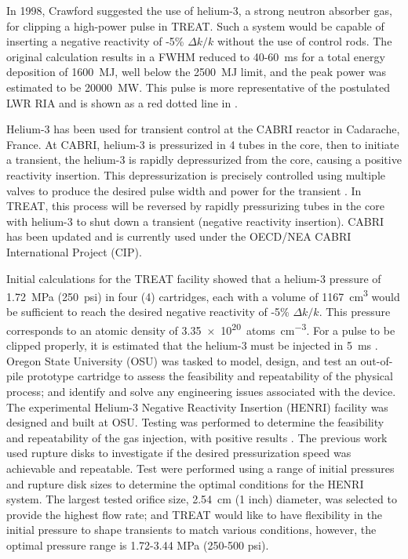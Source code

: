 In 1998, Crawford \cite{Crawford1998} suggested the use of helium-3, a strong neutron absorber gas, for clipping a high-power pulse in TREAT. Such a system would be capable of inserting a negative reactivity of -5\% $\Delta k/k$ without the use of control rods. The original calculation results in a FWHM reduced to 40-\SI{60}{\milli\second} for a total energy deposition of \SI{1600}{\mega\joule}, well below the \SI{2500}{\mega\joule} limit, and the peak power was estimated to be \SI{20000}{\mega\watt}. This pulse is more representative of the postulated LWR RIA and is shown as a red dotted line in .

Helium-3 has been used for transient control at the CABRI reactor in Cadarache, France. At CABRI, helium-3 is pressurized in 4 tubes in the core, then to initiate a transient, the helium-3 is rapidly depressurized from the core, causing a positive reactivity insertion. This depressurization is precisely controlled using multiple valves to produce the desired pulse width and power for the transient \cite{Clamens2016,Clamens2018,Clamens2018b}. In TREAT, this process will be reversed by rapidly pressurizing tubes in the core with helium-3 to shut down a transient (negative reactivity insertion). CABRI has been updated and is currently used under the OECD/NEA CABRI International Project (CIP).

Initial calculations for the TREAT facility showed that a helium-3 pressure of \SI{1.72}{\mega\pascal} (\SI{250}{psi}) in four (4) cartridges, each with a volume of \SI{1167}{\centi\meter^3} would be sufficient to reach the desired negative reactivity of -5\% $\Delta k/k$. This pressure corresponds to an atomic density of \SI{3.35e20}{atoms\per\centi\meter^3}. For a pulse to be clipped properly, it is estimated that the helium-3 must be injected in \SI{5}{\milli\second} \cite{BESS2019}. Oregon State University (OSU) was tasked to model, design, and test an out-of-pile prototype cartridge to assess the feasibility and repeatability of the physical process; and identify and solve any engineering issues associated with the device. The experimental Helium-3 Negative Reactivity Insertion (HENRI) facility was designed and built at OSU. Testing was performed to determine the feasibility and repeatability of the gas injection, with positive results \cite{HeNURETH}. The previous work used rupture disks to investigate if the desired pressurization speed was achievable and repeatable. Test were performed using a range of initial pressures and rupture disk sizes to determine the optimal conditions for the HENRI system. The largest tested orifice size, \SI{2.54}{\centi\meter} (1 inch) diameter, was selected to provide the highest flow rate; and TREAT would like to have flexibility in the initial pressure to shape transients to match various conditions, however, the optimal pressure range is 1.72-3.44 \si{\mega\pascal} (250-500 psi).



